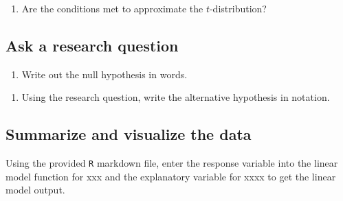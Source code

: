 \documentclass[
]{report}
\newenvironment{Shaded}{\begin{snugshade}}{\end{snugshade}}
\newcommand{\CommentTok}[1]{\textcolor[rgb]{0.56,0.35,0.01}{\textit{#1}}}
\newcommand{\DataTypeTok}[1]{\textcolor[rgb]{0.13,0.29,0.53}{#1}}
\newcommand{\KeywordTok}[1]{\textcolor[rgb]{0.13,0.29,0.53}{\textbf{#1}}}
\newcommand{\NormalTok}[1]{#1}
\newcommand{\OperatorTok}[1]{\textcolor[rgb]{0.81,0.36,0.00}{\textbf{#1}}}
\newcommand{\StringTok}[1]{\textcolor[rgb]{0.31,0.60,0.02}{#1}}
\providecommand{\tightlist}{%
  \setlength{\itemsep}{0pt}\setlength{\parskip}{0pt}}
\begin{document}
\begin{enumerate}
\def\labelenumi{\arabic{enumi}.}
\setcounter{enumi}{4}
\tightlist
\item
  Are the conditions met to approximate the \(t\)-distribution?
\end{enumerate}

\vspace{1in}

\hypertarget{ask-a-research-question}{%
\subsection{Ask a research question}\label{ask-a-research-question}}

\begin{enumerate}
\def\labelenumi{\arabic{enumi}.}
\setcounter{enumi}{5}
\tightlist
\item
  Write out the null hypothesis in words.
\end{enumerate}

\vspace{1in}

\begin{enumerate}
\def\labelenumi{\arabic{enumi}.}
\setcounter{enumi}{6}
\tightlist
\item
  Using the research question, write the alternative hypothesis in notation.
\end{enumerate}

\vspace{0.5in}

\hypertarget{summarize-and-visualize-the-data}{%
\subsection{Summarize and visualize the data}\label{summarize-and-visualize-the-data}}

Using the provided \texttt{R} markdown file, enter the response variable into the linear model function for xxx and the explanatory variable for xxxx to get the linear model output.

\begin{Shaded}
\end{Shaded}
\end{document}
